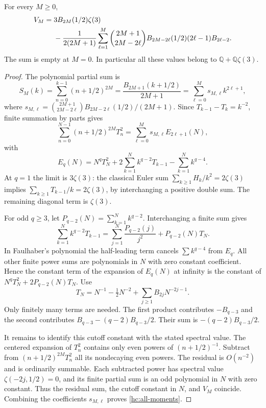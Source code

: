 \begin{theorem}
\label{hc:trigamma}
For every $M\ge0$,
\begin{align}\label{hc:all-moments}
 V_M={}&3B_{2M}(1/2)\zeta(3)\notag\\
 &-\frac1{2(2M+1)}\sum_{\ell=1}^{M}
 \binom{2M+1}{2M-2\ell}B_{2M-2\ell}(1/2)
                     (2\ell-1)B_{2\ell-2}.
\end{align}
The sum is empty at $M=0$. In particular all these values belong
to $\mathbb Q+\mathbb Q\zeta(3)$.
\end{theorem}
\begin{proof}
The polynomial partial sum is
\[
 S_M(k)=\sum_{n=0}^{k-1}(n+1/2)^{2M}
 =\frac{B_{2M+1}(k+1/2)}{2M+1}
 =\sum_{\ell=0}^M s_{M,\ell} k^{2\ell+1},
\]
where
$s_{M,\ell}=\binom{2M+1}{2M-2\ell}B_{2M-2\ell}(1/2)/(2M+1)$.
Since $T_{k-1}-T_k=k^{-2}$, finite summation by parts gives
\[
 \sum_{n=0}^{N-1}(n+1/2)^{2M}T_n^2
 =\sum_{\ell=0}^M s_{M,\ell}E_{2\ell+1}(N),
\]
with
\[
 E_q(N)=N^qT_N^2+2\sum_{k=1}^N k^{q-2}T_{k-1}
                                -\sum_{k=1}^N k^{q-4}.
\]
At $q=1$ the limit is $3\zeta(3)$: the classical Euler sum \cite{Can}
$\sum_{k\ge1}H_k/k^2=2\zeta(3)$ implies
$\sum_{k\ge1}T_{k-1}/k=2\zeta(3)$, by interchanging a positive
double sum. The remaining diagonal term is $\zeta(3)$.

For odd $q\ge3$, let $P_{q-2}(N)=\sum_{k=1}^N k^{q-2}$.
Interchanging a finite sum gives
\[
 \sum_{k=1}^N k^{q-2}T_{k-1}
   =\sum_{j=1}^N\frac{P_{q-2}(j)}{j^2}
                                +P_{q-2}(N)T_N.
\]
In Faulhaber's polynomial the half-leading term cancels
$\sum k^{q-4}$ from $E_q$. All other finite power sums are
polynomials in $N$ with zero constant coefficient. Hence the
constant term of the expansion of $E_q(N)$ at infinity is the
constant of $N^qT_N^2+2P_{q-2}(N)T_N$.
Use
\[
 T_N=N^{-1}-\tfrac12N^{-2}
                   +\sum_{j\ge1}B_{2j}N^{-2j-1}.
\]
Only finitely many terms are needed. The first product contributes
$-B_{q-3}$ and the second contributes
$B_{q-3}-(q-2)B_{q-3}/2$. Their sum is
$-(q-2)B_{q-3}/2$.

It remains to identify this cutoff constant with the stated
spectral value. The centered expansion of $T_n^2$ contains only
even powers of $(n+1/2)^{-1}$. Subtract from
$(n+1/2)^{2M}T_n^2$ all its nondecaying even powers. The residual
is $O(n^{-2})$ and is ordinarily summable. Each subtracted power
has spectral value $\zeta(-2j,1/2)=0$, and its finite partial sum
is an odd polynomial in $N$ with zero constant. Thus the residual
sum, the cutoff constant in $N$, and $V_M$ coincide. Combining
the coefficients $s_{M,\ell}$ proves \eqref{hc:all-moments}.
\end{proof}

